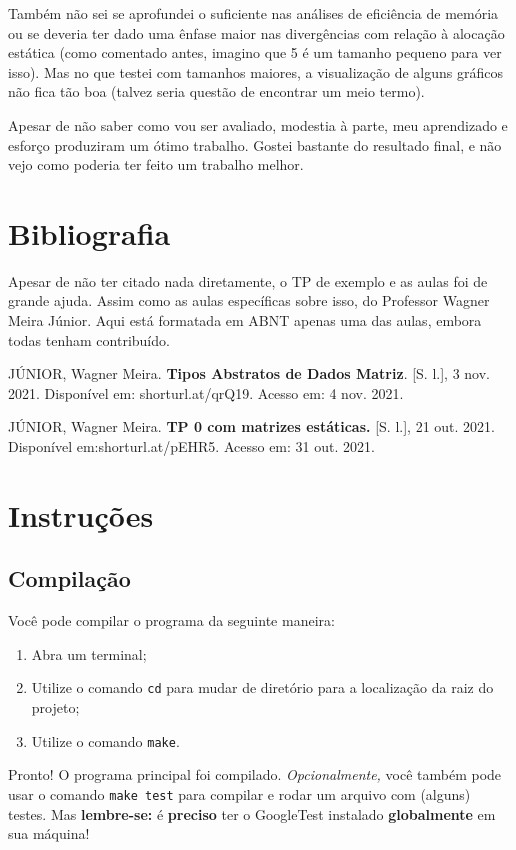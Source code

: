 \documentclass{article}
\def\code#1{\texttt{#1}}
\begin{document}
Também não sei se aprofundei o suficiente nas análises de eficiência de memória ou se deveria ter dado uma ênfase maior nas divergências com relação à alocação estática (como comentado antes, imagino que 5 é um tamanho pequeno para ver isso). Mas no que testei com tamanhos maiores, a visualização de alguns gráficos não fica tão boa (talvez seria questão de encontrar um meio termo).

Apesar de não saber como vou ser avaliado, modestia à parte, meu aprendizado e esforço produziram um ótimo trabalho. Gostei bastante do resultado final, e não vejo como poderia ter feito um trabalho melhor.

\section{Bibliografia}
Apesar de não ter citado nada diretamente, o TP de exemplo e as aulas foi de grande ajuda. Assim como as aulas específicas sobre isso, do Professor Wagner Meira Júnior. Aqui está formatada em ABNT apenas uma das aulas, embora todas tenham contribuído.

JÚNIOR, Wagner Meira. \textbf{Tipos Abstratos de Dados Matriz}. [S. l.], 3 nov. 2021. Disponível em: shorturl.at/qrQ19. Acesso em: 4 nov. 2021.

JÚNIOR, Wagner Meira. \textbf{TP 0 com matrizes estáticas.} [S. l.], 21 out. 2021. Disponível em:shorturl.at/pEHR5. Acesso em: 31 out. 2021.

\newpage

\section*{Instruções}

\subsection*{Compilação}

Você pode compilar o programa da seguinte maneira:

\begin{enumerate}
    \item Abra um terminal;
    \item Utilize o comando \code{cd} para mudar de diretório para a localização da raiz do projeto;
    \item Utilize o comando \code{make}. 
\end{enumerate}

Pronto! O programa principal foi compilado. \textit{Opcionalmente,} você também pode usar o comando \code{make test} para compilar e rodar um arquivo com (alguns) testes. Mas \textbf{lembre-se:} é \textbf{preciso} ter o GoogleTest instalado \textbf{globalmente} em sua máquina!
\end{document}
